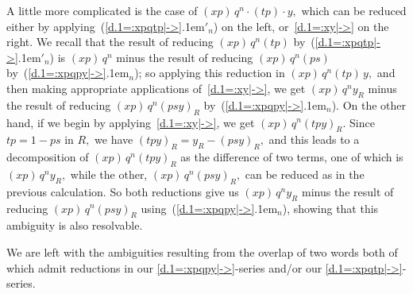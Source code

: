 \documentclass{amsart}
\begin{document}
A little more complicated is the case of $(xp)\,q^n\cdot (tp)\cdot y,$
which can be reduced either by applying~({{\setlength{\mathsurround}{0em}\ref{d.1=:xpqtp|->}\kern.1em$'_{{n}}$}}) on the left,
or~\eqref{d.1=:xy|->} on the right.
We recall that the result of reducing
$(xp)\,q^n(tp)$ by~({{\setlength{\mathsurround}{0em}\ref{d.1=:xpqtp|->}\kern.1em$'_{{n}}$}})
is $(xp)\,q^n$ minus the result of reducing
$(xp)\,q^n(ps)$ by~({{\setlength{\mathsurround}{0em}\ref{d.1=:xpqpy|->}\kern.1em$_{{n}}$}}); so applying this reduction in
$(xp)\,q^n (tp)\,y,$ and then making appropriate applications
of~\eqref{d.1=:xy|->}, we get $(xp)\,q^n y_R$
minus the result of reducing
$(xp)\,q^n(psy)_R$ by~({{\setlength{\mathsurround}{0em}\ref{d.1=:xpqpy|->}\kern.1em$_{{n}}$}}).
On the other hand, if we begin by
applying~\eqref{d.1=:xy|->}, we get $(xp)\,q^n (tpy)_R.$
Since $tp=1-ps$ in $R,$ we have $(tpy)_R = y_R - (psy)_R,$
and this leads to a decomposition of $(xp)\,q^n (tpy)_R$
as the difference of two terms, one of which is $(xp)\,q^n y_R,$
while the other, $(xp)\,q^n(psy)_R,$ can be reduced
as in the previous calculation.
So both reductions give
us $(xp)\,q^n y_R$ minus the result of reducing
$(xp)\,q^n(psy)_R$ using~({{\setlength{\mathsurround}{0em}\ref{d.1=:xpqpy|->}\kern.1em$_{{n}}$}}), showing
that this ambiguity is also resolvable.

We are left with the ambiguities resulting from the
overlap of two words both of which admit reductions in
our \eqref{d.1=:xpqpy|->}-series and/or
our \eqref{d.1=:xpqtp|->}-series.
\end{document}
